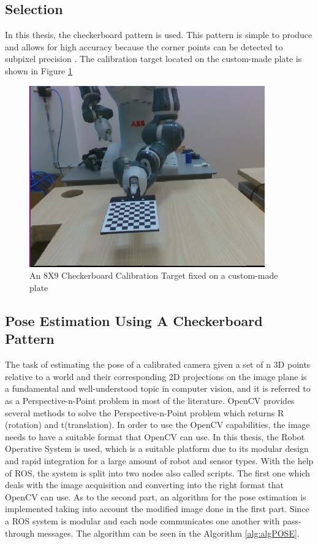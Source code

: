\subsection{Selection}
In this thesis, the checkerboard pattern is used.  This pattern is simple to produce and allows for high accuracy because the corner points can be detected to subpixel precision \cite{planarTargets}. The calibration target located on the custom-made plate is shown in Figure \ref{fig:target2}


\begin{figure}[!h]
\begin{center}
\includegraphics[width=4in]{figures03/target1.png}
\caption{An 8X9 Checkerboard Calibration Target fixed on a custom-made plate}
\label{fig:target2}
\end{center}
\end{figure}

\subsection{Pose Estimation Using A Checkerboard Pattern}\label{pose1}

The task of estimating the pose of a calibrated camera given a set of n 3D points relative to a world and their corresponding 2D projections on the image plane is a fundamental and well-understood topic in computer vision, and it is referred to as a Perspective-n-Point problem in most of the literature. OpenCV provides several methods to solve the Perspective-n-Point problem which returns R (rotation) and t(translation). In order to use the OpenCV capabilities, the image needs to have a suitable format that OpenCV can use. In this thesis, the Robot Operative System is used, which is a suitable platform due to its modular design and rapid integration for a large amount of robot and sensor types.
With the help of ROS, the system is split into two nodes also called scripts. The first one which deals with the image acquisition and converting into the right format that OpenCV can use. As to the second part, an algorithm for the pose estimation is implemented taking into account the modified image done in the first part. 
Since a ROS system is modular and each node communicates one another with pass-through messages. The algorithm can be seen in the Algorithm \ref{alg:algPOSE}.

